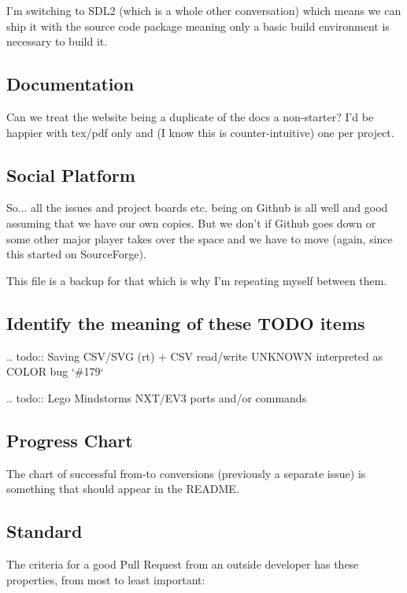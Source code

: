 \documentclass[11pt]{report}
\begin{document}
I'm switching to SDL2 (which is a whole other conversation) which means
we can ship it with the source code package meaning only a basic build
environment is necessary to build it.

\subsection{Documentation}

Can we treat the website being a duplicate of the docs a non-starter?
I'd be happier with tex/pdf only and (I know this is counter-intuitive)
one per project.

\subsection{Social Platform}

So... all the issues and project boards etc. being on Github is all
well and good assuming that we have our own copies. But we don't if
Github goes down or some other major player takes over the space and we
have to move (again, since this started on SourceForge).

This file is a backup for that which is why I'm repeating myself between
them.

\subsection{Identify the meaning of these TODO items}

.. todo::
   Saving CSV/SVG (rt) + CSV read/write UNKNOWN interpreted as COLOR bug `\#179`

.. todo::
   Lego Mindstorms NXT/EV3 ports and/or commands

\subsection{Progress Chart}

The chart of successful from-to conversions (previously a separate issue)
is something that should appear in the README.

\subsection{Standard}

The criteria for a good Pull Request from an outside developer has these properties, from most to least important:

\end{document}

